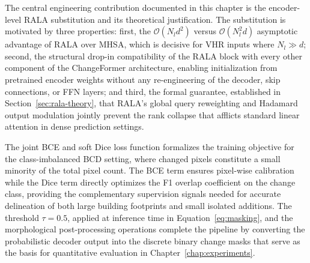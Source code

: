 The central engineering contribution documented in this chapter is the encoder-level \ac{RALA} substitution and its theoretical justification. The substitution is motivated by three properties: first, the $\mathcal{O}(N_l d^2)$ versus $\mathcal{O}(N_l^2 d)$ asymptotic advantage of \ac{RALA} over \ac{MHSA}, which is decisive for \ac{VHR} inputs where $N_l \gg d$; second, the structural drop-in compatibility of the \ac{RALA} block with every other component of the ChangeFormer architecture, enabling initialization from pretrained encoder weights without any re-engineering of the decoder, skip connections, or \ac{FFN} layers; and third, the formal guarantee, established in Section~\ref{sec:rala-theory}, that \ac{RALA}'s global query reweighting and Hadamard output modulation jointly prevent the rank collapse that afflicts standard linear attention in dense prediction settings.

The joint \ac{BCE} and soft Dice loss function formalizes the training objective for the class-imbalanced \ac{BCD} setting, where changed pixels constitute a small minority of the total pixel count. The \ac{BCE} term ensures pixel-wise calibration while the Dice term directly optimizes the F1 overlap coefficient on the change class, providing the complementary supervision signals needed for accurate delineation of both large building footprints and small isolated additions. The threshold $\tau = 0.5$, applied at inference time in Equation~\ref{eq:masking}, and the morphological post-processing operations complete the pipeline by converting the probabilistic decoder output into the discrete binary change masks that serve as the basis for quantitative evaluation in Chapter~\ref{chap:experiments}.